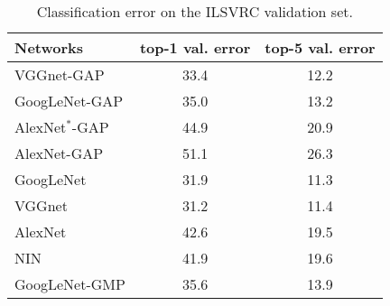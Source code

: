 \documentclass[10pt,twocolumn,letterpaper]{article}
\begin{document}





\begin{table}\caption{Classification error on the ILSVRC validation set.}
\label{network_classificationValidation}
\centering
\footnotesize
\begin{tabular}{ l | c | c }
  \hline  
  \hline                       
  Networks & top-1 val. error & top-5 val. error \\
    \hline   
VGGnet-GAP& 33.4 & 12.2 \\
GoogLeNet-GAP& 35.0 & 13.2 \\
AlexNet$^{*}$-GAP & 44.9 & 20.9 \\
AlexNet-GAP & 51.1 & 26.3 \\
\hline
  GoogLeNet & 31.9 & 11.3 \\ 
  VGGnet & 31.2 &  11.4 \\    
  AlexNet &  42.6 &  19.5  \\
    NIN & 41.9 & 19.6 \\
    \hline 
    GoogLeNet-GMP & 35.6 & 13.9 \\    
    \hline
\end{tabular}
\end{table}
\end{document}
